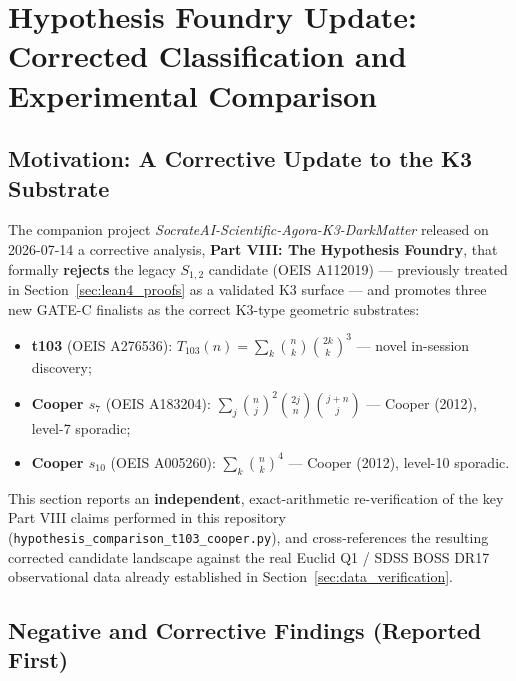 
\section{Hypothesis Foundry Update: Corrected Classification and Experimental Comparison}
\label{sec:hypothesis_foundry_update}

\subsection{Motivation: A Corrective Update to the K3 Substrate}

The companion project \textit{SocrateAI-Scientific-Agora-K3-DarkMatter} released
on 2026-07-14 a corrective analysis, \textbf{Part VIII: The Hypothesis Foundry},
that formally \textbf{rejects} the legacy $S_{1,2}$ candidate (OEIS
A112019) — previously treated in Section~\ref{sec:lean4_proofs} as a
validated K3 surface — and promotes three new GATE-C finalists as the correct
K3-type geometric substrates:

\begin{itemize}
    \item \textbf{t103} (OEIS A276536): $T_{103}(n) = \sum_k \binom{n}{k}\binom{2k}{k}^3$ — novel in-session discovery;
    \item \textbf{Cooper $s_7$} (OEIS A183204): $\sum_j \binom{n}{j}^2\binom{2j}{n}\binom{j+n}{j}$ — Cooper (2012), level-7 sporadic;
    \item \textbf{Cooper $s_{10}$} (OEIS A005260): $\sum_k \binom{n}{k}^4$ — Cooper (2012), level-10 sporadic.
\end{itemize}

This section reports an \textbf{independent}, exact-arithmetic re-verification
of the key Part VIII claims performed in this repository
(\texttt{hypothesis\_comparison\_t103\_cooper.py}), and cross-references the
resulting corrected candidate landscape against the real Euclid Q1 / SDSS BOSS
DR17 observational data already established in
Section~\ref{sec:data_verification}.

\subsection{Negative and Corrective Findings (Reported First)}

